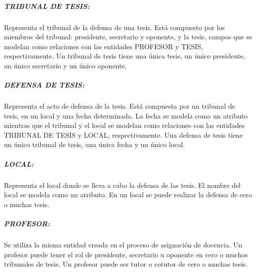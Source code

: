 \subparagraph{TRIBUNAL DE TESIS:}
Representa el tribunal de la defensa de una tesis.
Está compuesto por los miembros del tribunal: presidente, secretario y oponente, 
y la tesis, campos que se modelan como relaciones con las entidades PROFESOR y TESIS, respectivamente.
Un tribunal de tesis tiene una única tesis, un único presidente, un único secretario y 
un único oponente.


\subparagraph{DEFENSA DE TESIS:}
Representa el acto de defensa de la tesis. 
Está compuesta por un tribunal de tesis, en un local y una 
fecha determinada. La fecha se modela como un atributo mientras que 
el tribunal y el local se modelan como relaciones con las entidades TRIBUNAL DE 
TESIS y LOCAL, respectivamente. Una defensa de tesis tiene un único tribunal de tesis,
una única fecha y un único local.



\subparagraph{LOCAL:}
Representa el local donde se lleva a cabo la defensa de las tesis.
El nombre del local se modela como un atributo. 
En un local se puede realizar la defensa de cero o muchas tesis.


\subparagraph{PROFESOR:}
Se utiliza la misma entidad creada en el proceso de asignación de docencia.
Un profesor puede tener el rol de presidente, secretario u oponente en cero o 
muchos tribunales de tesis. Un profesor puede ser 
tutor o cotutor de cero o muchas tesis. \\





